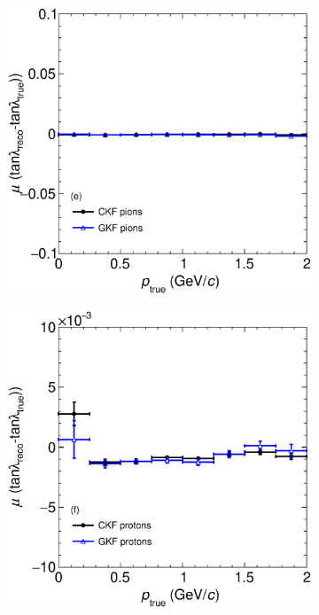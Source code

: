 \begin{figure}[t]
\begin{subfigure}{0.32\textwidth}
         \caption{}
         \label{fig:tanlambdaBiasVSp13_Int}
     \end{subfigure}
     \begin{subfigure}{0.32\textwidth}
         \centering
         \includegraphics[width=\textwidth]{figures/ch5-KF_NDGAr/FullSample/Int/Angle_Res/tanlambda/BiastanlambdaVSp_211.eps}
         \caption{}
         \label{fig:tanlambdaBiasVSp211_Int}
     \end{subfigure}
          \begin{subfigure}{0.32\textwidth}
         \centering
         \includegraphics[width=\textwidth]{figures/ch5-KF_NDGAr/FullSample/Int/Angle_Res/tanlambda/BiastanlambdaVSp_2212.eps}

\end{subfigure}
\end{figure}
